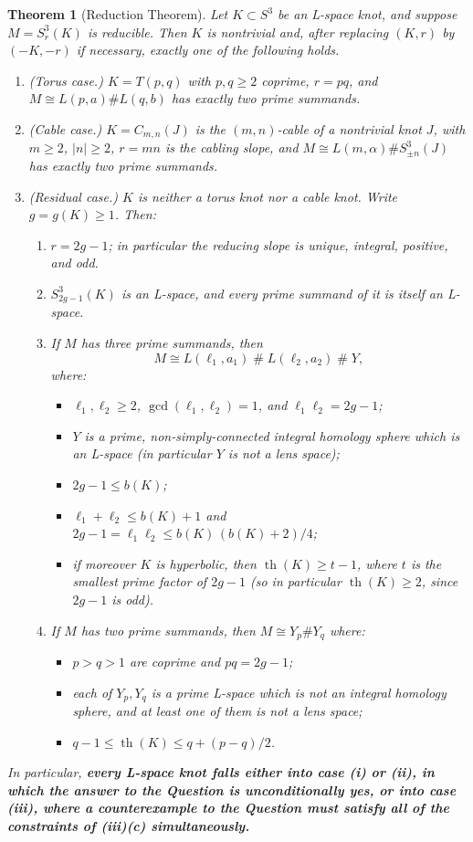 \documentclass[11pt]{amsart}
\newtheorem{theorem}{Theorem}[section]
\theoremstyle{definition}
\theoremstyle{remark}
\numberwithin{equation}{section}
\begin{document}
\begin{theorem}[Reduction Theorem]\label{thm:main}
Let $K\subset S^{3}$ be an L-space knot, and suppose
$M=S^{3}_{r}(K)$ is reducible. Then $K$ is nontrivial and, after
replacing $(K,r)$ by $(-K,-r)$ if necessary, exactly one of the following
holds.
\begin{enumerate}
\item[\textup{(i)}] \emph{(Torus case.)} $K=T(p,q)$ with $p,q\ge2$
coprime, $r=pq$, and
$M\cong L(p,a)\#L(q,b)$ has exactly two prime summands.
\item[\textup{(ii)}] \emph{(Cable case.)} $K=C_{m,n}(J)$ is the
$(m,n)$-cable of a nontrivial knot $J$, with $m\ge2$, $|n|\ge2$,
$r=mn$ is the cabling slope, and $M\cong L(m,\alpha)\#S^{3}_{\pm n}(J)$
has exactly two prime summands.
\item[\textup{(iii)}] \emph{(Residual case.)} $K$ is neither a torus
knot nor a cable knot. Write $g=g(K)\ge1$. Then:
\begin{enumerate}
\item $r=2g-1$; in particular the reducing slope is unique, integral,
positive, and odd.
\item $S^{3}_{2g-1}(K)$ is an L-space, and every prime summand of it is
itself an L-space.
\item \emph{If $M$ has three prime summands}, then
\[
M\cong L(\ell_{1},a_{1})\;\#\;L(\ell_{2},a_{2})\;\#\;Y,
\]
where:
\begin{itemize}
\item $\ell_{1},\ell_{2}\ge2$, $\gcd(\ell_{1},\ell_{2})=1$, and
$\ell_{1}\ell_{2}=2g-1$;
\item $Y$ is a prime, non-simply-connected integral homology sphere
which is an L-space (in particular $Y$ is not a lens space);
\item $2g-1\le b(K)$;
\item $\ell_{1}+\ell_{2}\le b(K)+1$ and
$2g-1=\ell_{1}\ell_{2}\le b(K)\,(b(K)+2)/4$;
\item if moreover $K$ is hyperbolic, then
$\operatorname{th}(K)\ge t-1$, where $t$ is the smallest prime factor
of $2g-1$ (so in particular $\operatorname{th}(K)\ge2$, since $2g-1$
is odd).
\end{itemize}
\item \emph{If $M$ has two prime summands}, then
$M\cong Y_{p}\#Y_{q}$ where:
\begin{itemize}
\item $p>q>1$ are coprime and $pq=2g-1$;
\item each of $Y_{p},Y_{q}$ is a prime L-space which is not an
integral homology sphere, and at least one of them is not a lens space;
\item $q-1\le\operatorname{th}(K)\le q+(p-q)/2$.
\end{itemize}
\end{enumerate}
\end{enumerate}
In particular, \textbf{every L-space knot falls either into case
\textup{(i)} or \textup{(ii)}, in which the answer to the Question is
unconditionally \emph{yes}, or into case \textup{(iii)}, where a
counterexample to the Question must satisfy all of the constraints of
\textup{(iii)(c)} simultaneously.}
\end{theorem}
\end{document}
